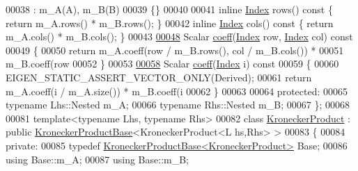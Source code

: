 \begin{DoxyCode}
00038       : m\_A(A), m\_B(B)
00039     \{\}
00040 
00041     \textcolor{keyword}{inline} \hyperlink{namespace_eigen_a62e77e0933482dafde8fe197d9a2cfde}{Index} rows()\textcolor{keyword}{ const }\{ \textcolor{keywordflow}{return} m\_A.rows() * m\_B.rows(); \}
00042     \textcolor{keyword}{inline} \hyperlink{namespace_eigen_a62e77e0933482dafde8fe197d9a2cfde}{Index} cols()\textcolor{keyword}{ const }\{ \textcolor{keywordflow}{return} m\_A.cols() * m\_B.cols(); \}
00043 
\hyperlink{class_eigen_1_1_kronecker_product_base_a0b302d4e55f5a58955e6c645d066928f}{00048}     Scalar \hyperlink{class_eigen_1_1_kronecker_product_base_a0b302d4e55f5a58955e6c645d066928f}{coeff}(\hyperlink{namespace_eigen_a62e77e0933482dafde8fe197d9a2cfde}{Index} row, \hyperlink{namespace_eigen_a62e77e0933482dafde8fe197d9a2cfde}{Index} col)\textcolor{keyword}{ const}
00049 \textcolor{keyword}{    }\{
00050       \textcolor{keywordflow}{return} m\_A.coeff(row / m\_B.rows(), col / m\_B.cols()) *
00051              m\_B.coeff(row %
00052     \}
00053 
\hyperlink{class_eigen_1_1_kronecker_product_base_a673348e7d9d2a4570aa0bcac33507f7b}{00058}     Scalar \hyperlink{class_eigen_1_1_kronecker_product_base_a673348e7d9d2a4570aa0bcac33507f7b}{coeff}(\hyperlink{namespace_eigen_a62e77e0933482dafde8fe197d9a2cfde}{Index} i)\textcolor{keyword}{ const}
00059 \textcolor{keyword}{    }\{
00060       EIGEN\_STATIC\_ASSERT\_VECTOR\_ONLY(Derived);
00061       \textcolor{keywordflow}{return} m\_A.coeff(i / m\_A.size()) * m\_B.coeff(i %
00062     \}
00063 
00064   \textcolor{keyword}{protected}:
00065     \textcolor{keyword}{typename} Lhs::Nested m\_A;
00066     \textcolor{keyword}{typename} Rhs::Nested m\_B;
00067 \};
00068 
00081 \textcolor{keyword}{template}<\textcolor{keyword}{typename} Lhs, \textcolor{keyword}{typename} Rhs>
00082 \textcolor{keyword}{class }\hyperlink{class_eigen_1_1_kronecker_product}{KroneckerProduct} : \textcolor{keyword}{public} \hyperlink{class_eigen_1_1_kronecker_product_base}{KroneckerProductBase}<KroneckerProduct<L
      hs,Rhs> >
00083 \{
00084   \textcolor{keyword}{private}:
00085     \textcolor{keyword}{typedef} \hyperlink{class_eigen_1_1_kronecker_product_base}{KroneckerProductBase<KroneckerProduct>} Base;
00086     \textcolor{keyword}{using} Base::m\_A;
00087     \textcolor{keyword}{using} Base::m\_B;

\end{DoxyCode}
